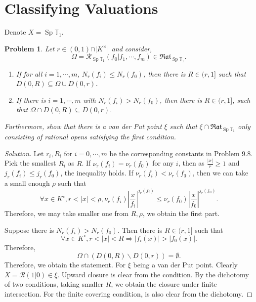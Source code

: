\documentclass[8pt]{article}
\numberwithin{equation}{section}
\newenvironment{solution}{\begin{proof}[Solution]}{\end{proof}}
\newtheorem{problem}{Problem}[section]
\DeclareMathOperator{\Sp}{Sp}
\newcommand{\T}[0]{\mathbb{T}}
\newcommand{\cR}[0]{\mathcal{R}}
\newcommand{\ab}[1]{\vert #1 \vert}
\newcommand{\Rat}[0]{\mathfrak{Rat}}
\begin{document}
\section{Classifying Valuations}
Denote $X=\Sp\T_1$.
\begin{problem}
  Let $r\in(0,1)\cap\ab{K^\times}$ and consider,
  \begin{equation*}
    \Omega = \cR_{\Sp\T_1}(f_0|f_1,\cdots,f_m)\in\Rat_{\Sp\T_1}.
  \end{equation*}
  \begin{enumerate}
    \item If for all $i=1,\cdots,m$, $N_r(f_i)\leq N_r(f_0)$, then there is $R\in(r,1]$ such that $D(0,R)\subseteq \Omega\cup D(0,r)$.
    \item If there is $i=1,\cdots,m$ with $N_r(f_i)>N_r(f_0)$, then there is $R\in(r,1]$, such that $\Omega\cap D(0,R)\subseteq D(0,r)$.
  \end{enumerate}
  Furthermore, show that there is a van der Put point $\xi$ such that $\xi\cap\Rat_{\Sp\T_1}$ only consisting of rational opens satisfying the first condition.
\end{problem}
\begin{solution}
  Let $r_i,R_i$ for $i=0,\cdots,m$ be the corresponding constants in Problem 9.8. Pick the smallest $R_i$ as $R$.
  If $\nu_r(f_i) = \nu_r(f_0)$ for any $i$, then as ${\frac {\ab{x}} r}\geq 1$ and $j_r(f_i)\leq j_r(f_0)$, the inequality holds. 
  If $\nu_r(f_i) < \nu_r(f_0)$, then we can take a small enough $\rho$ such that 
  \begin{equation*}
    \forall x\in K^\circ, r<\ab{x}<\rho, \nu_r(f_i)\left\vert{\frac {x} {f_i}}\right\vert^{j_r(f_i)}\leq \nu_r(f_0)\left\vert{\frac {x} {f_0}}\right\vert^{j_r(f_0)}.
  \end{equation*}
  Therefore, we may take smaller one from $R,\rho$, we obtain the first part.
  \par Suppose there is $N_r(f_i)>N_r(f_0)$. Then there is $R\in(r,1]$ such that 
  \begin{equation*}
    \forall x\in K^\circ, r<\ab{x}<R\Rightarrow \ab{f_i(x)}>\ab{f_0(x)}.
  \end{equation*}
  Therefore,
  \begin{equation*}
    \Omega\cap (D(0,R)\backslash D(0,r))=\emptyset. 
  \end{equation*}
  Therefore, we obtain the statement. For $\xi$ being a van der Put point. Clearly $X= \cR(1|0)\in\xi$. Upward closure is clear from the condition.
  By the dichotomy of two conditions, taking smaller $R$, we obtain the closure under finite intersection. For the finite covering condition, is also clear from the dichotomy.
\end{solution}
\end{document}
